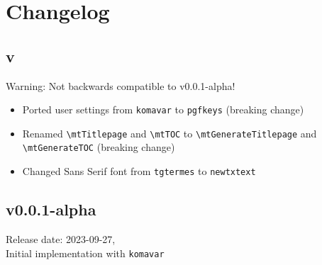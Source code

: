 \chapter{Changelog}
	\section{v\releaseVersion}
		Warning: Not backwards compatible to v0.0.1-alpha!
		\begin{itemize}
			\item Ported user settings from \verb|komavar| to \verb|pgfkeys| (breaking change)
			\item Renamed \verb|\mtTitlepage| and \verb|\mtTOC| to \verb|\mtGenerateTitlepage| and \verb|\mtGenerateTOC| (breaking change)
			\item Changed Sans Serif font from \verb|tgtermes| to \verb|newtxtext| 
		\end{itemize}
	
	\section{v0.0.1-alpha}
		Release date: 2023-09-27,\\
		Initial implementation with \verb|komavar|